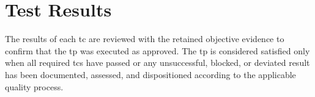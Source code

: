 \section{Test Results}
The results of each \gls{tc} are reviewed with the retained objective evidence
to confirm that the \gls{tp} was executed as approved.  The \gls{tp} is
considered satisfied only when all required \glspl{tc} have passed or any
unsuccessful, blocked, or deviated result has been documented, assessed, and
dispositioned according to the applicable quality process.
